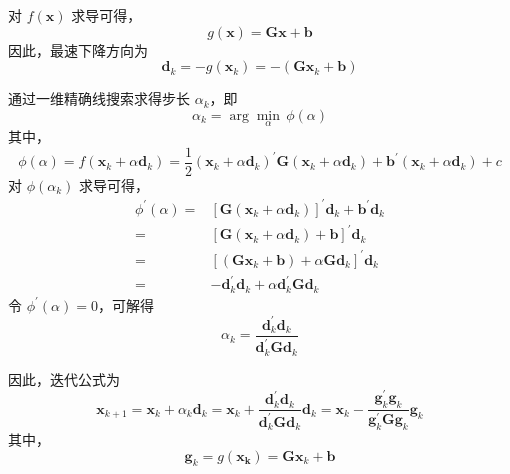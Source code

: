 \documentclass[cn,mtpro2,12pt]{elegantbook}
\begin{document}
\begin{solution}
    对 $f(\mathbf{x})$ 求导可得，
    \begin{equation}
        g(\mathbf{x})=\mathbf{G}\mathbf{x}+\mathbf{b}
    \end{equation}
    因此，最速下降方向为
    \begin{equation}
        \mathbf{d}_{k}=-g(\mathbf{x}_{k})=-\left(\mathbf{G}\mathbf{x}_{k}+\mathbf{b}\right)
    \end{equation}

    通过一维精确线搜索求得步长 $\alpha_{k}$，即
    \begin{equation}
        \alpha_{k}=\arg\min_{\alpha}\,\phi(\alpha)
    \end{equation}
    其中，
    \begin{equation}
        \phi(\alpha)=f(\mathbf{x}_{k}+\alpha\mathbf{d}_{k})=\frac{1}{2}\left(\mathbf{x}_{k}+\alpha\mathbf{d}_{k}\right)^{\prime}\mathbf{G}\left(\mathbf{x}_{k}+\alpha\mathbf{d}_{k}\right)+\mathbf{b}^{\prime}\left(\mathbf{x}_{k}+\alpha\mathbf{d}_{k}\right)+c
    \end{equation}
    对 $\phi(\alpha_{k})$ 求导可得，
    \begin{equation}
        \begin{aligned}
            \phi^{\prime}(\alpha)= & \left[\mathbf{G}\left(\mathbf{x}_{k}+\alpha\mathbf{d}_{k}\right)\right]^{\prime}\mathbf{d}_{k}+\mathbf{b}^{\prime}\mathbf{d}_{k} \\
            =                      & \left[\mathbf{G}\left(\mathbf{x}_{k}+\alpha\mathbf{d}_{k}\right)+\mathbf{b}\right]^{\prime}\mathbf{d}_{k}                        \\
            =                      & \left[\left(\mathbf{G}\mathbf{x}_{k}+\mathbf{b}\right)+\alpha\mathbf{G}\mathbf{d}_{k}\right]^{\prime}\mathbf{d}_{k}              \\
            =                      & -\mathbf{d}_{k}^{\prime}\mathbf{d}_{k}+\alpha\mathbf{d}_{k}^{\prime}\mathbf{G}\mathbf{d}_{k}
        \end{aligned}
    \end{equation}
    令 $\phi^{\prime}(\alpha)=0$，可解得
    \begin{equation}
        \alpha_{k}=\frac{\mathbf{d}_{k}^{\prime}\mathbf{d}_{k}}{\mathbf{d}_{k}^{\prime}\mathbf{G}\mathbf{d}_{k}}
    \end{equation}

    因此，迭代公式为
    \begin{equation}
        \mathbf{x}_{k+1}=\mathbf{x}_{k}+\alpha_{k}\mathbf{d}_{k}=\mathbf{x}_{k}+\frac{\mathbf{d}_{k}^{\prime}\mathbf{d}_{k}}{\mathbf{d}_{k}^{\prime}\mathbf{G}\mathbf{d}_{k}}\mathbf{d}_{k}=\mathbf{x}_{k}-\frac{\mathbf{g}_{k}^{\prime}\mathbf{g}_{k}}{\mathbf{g}_{k}^{\prime}\mathbf{G}\mathbf{g}_{k}}\mathbf{g}_{k}
    \end{equation}
    其中，
    \begin{equation}
        \mathbf{g}_{k}=g(\mathbf{x_{k}})=\mathbf{G}\mathbf{x}_{k}+\mathbf{b}
    \end{equation}
\end{solution}
\end{document}
